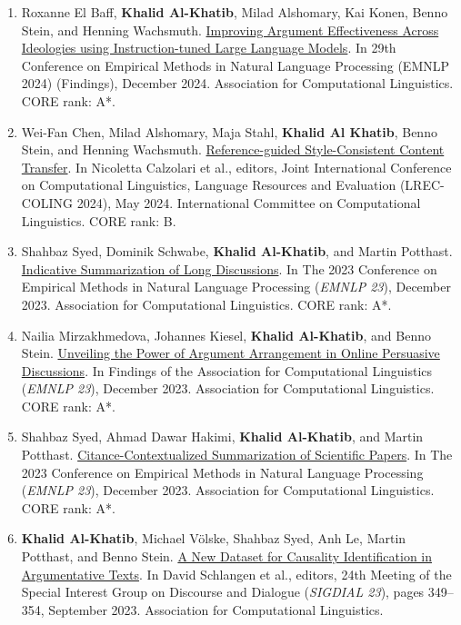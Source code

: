 \begin{enumerate}
\item Roxanne El Baff, \textbf{Khalid Al-Khatib}, Milad Alshomary, Kai Konen, Benno Stein, and Henning Wachsmuth. \href{https://aclanthology.org/2024.findings-emnlp.265/}{Improving Argument Effectiveness Across Ideologies using Instruction-tuned Large Language Models}. In 29th Conference on Empirical Methods in Natural Language Processing (EMNLP 2024) (Findings), December 2024. Association for Computational Linguistics. 
CORE rank: A*.
\item  Wei-Fan Chen, Milad Alshomary, Maja Stahl,  \textbf{Khalid Al Khatib}, Benno Stein, and Henning Wachsmuth. \href{https://aclanthology.org/2024.lrec-main.1201/}{Reference-guided Style-Consistent Content Transfer}. In Nicoletta Calzolari et al., editors, Joint International Conference on Computational Linguistics, Language Resources and Evaluation (LREC-COLING 2024), May 2024. International Committee on Computational Linguistics. 
CORE rank: B.
\item {Shahbaz Syed, Dominik Schwabe, \textbf{Khalid Al-Khatib}, and Martin Potthast. \href{https://aclanthology.org/2023.emnlp-main.166/}{Indicative Summarization of Long Discussions}. In The 2023 Conference on Empirical Methods in Natural Language Processing (\textit{EMNLP 23}), December 2023. Association for Computational Linguistics.
CORE rank: A*. 
}
\item {Nailia Mirzakhmedova, Johannes Kiesel, \textbf{Khalid Al-Khatib}, and Benno Stein. \href{https://aclanthology.org/2023.findings-emnlp.1048/}{Unveiling the Power of Argument Arrangement in Online Persuasive Discussions}. In Findings of the Association for Computational Linguistics (\textit{EMNLP 23}), December 2023. Association for Computational Linguistics.
CORE rank: A*. 
}
\item {Shahbaz Syed, Ahmad Dawar Hakimi, \textbf{Khalid Al-Khatib}, and Martin Potthast. \href{https://aclanthology.org/2023.findings-emnlp.573/}{Citance-Contextualized Summarization of Scientific Papers}. In The 2023 Conference on Empirical Methods in Natural Language Processing (\textit{EMNLP 23}), December 2023. Association for Computational Linguistics.
CORE rank: A*. 
}
\item {\textbf{Khalid Al-Khatib}, Michael Völske, Shahbaz Syed, Anh Le, Martin Potthast, and Benno Stein. \href{https://aclanthology.org/2023.sigdial-1.31/}{A New Dataset for Causality Identification in Argumentative Texts}. In David Schlangen et al., editors, 24th Meeting of the Special Interest Group on Discourse and Dialogue (\textit{SIGDIAL 23}), pages 349–354, September 2023. Association for Computational Linguistics. 
}
\end{enumerate}
